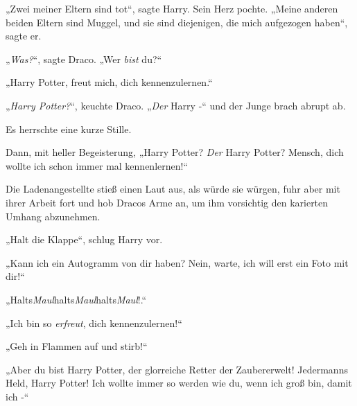 „Zwei meiner Eltern sind tot“, sagte Harry. Sein Herz pochte. „Meine anderen beiden Eltern sind Muggel, und sie sind diejenigen, die mich aufgezogen haben“, sagte er.

„\emph{Was?}“, sagte Draco. „Wer \emph{bist} du?“

„Harry Potter, freut mich, dich kennenzulernen.“

„\emph{Harry Potter?}“, keuchte Draco. „\emph{Der} Harry -“ und der Junge brach abrupt ab.

Es herrschte eine kurze Stille.

Dann, mit heller Begeisterung, „Harry Potter? \emph{Der} Harry Potter? Mensch, dich wollte ich schon immer mal kennenlernen!“

Die Ladenangestellte stieß einen Laut aus, als würde sie würgen, fuhr aber mit ihrer Arbeit fort und hob Dracos Arme an, um ihm vorsichtig den karierten Umhang abzunehmen.

„Halt die Klappe“, schlug Harry vor.

„Kann ich ein Autogramm von dir haben? Nein, warte, ich will erst ein Foto mit dir!“

„Halts\emph{Maul}halts\emph{Maul}halts\emph{Maul}!.“

„Ich bin so \emph{erfreut}, dich kennenzulernen!“

„Geh in Flammen auf und stirb!“

„Aber du bist Harry Potter, der glorreiche Retter der Zaubererwelt! Jedermanns Held, Harry Potter! Ich wollte immer so werden wie du, wenn ich groß bin, damit ich -“


